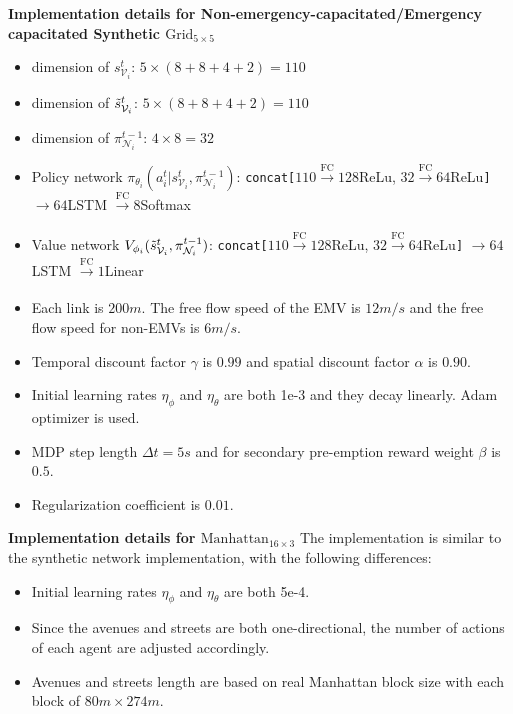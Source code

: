 \textbf{Implementation details for Non-emergency-capacitated/Emergency capacitated Synthetic \texorpdfstring{$\text{Grid}_{5 \times 5}$}{Grid}}
\begin{itemize}
    \item dimension of $s^t_{\mathcal{V}_i}$: $5 \times (8+8+4+2)=110$
    \item dimension of $\Tilde{s}^t_{\mathcal{V}_i}$: $5 \times (8+8+4+2)=110$
    \item dimension of $\pi^{t-1}_{\mathcal{N}_i}$: $4 \times 8 = 32$
    \item Policy network $\pi_{\theta_i}(a_i^t|s^t_{\mathcal{V}_i}, \pi^{t-1}_{\mathcal{N}_i})$: 
    \texttt{concat[}$110 \xrightarrow[]{\textrm{FC}} 128$ReLu, $32 \xrightarrow[]{\textrm{FC}} 64$ReLu\texttt{]} $ \xrightarrow[]{} 64$LSTM $ \xrightarrow[]{\textrm{FC}}8$Softmax
    \item Value network $V_{\phi_i}(\Tilde{s}^t_{\mathcal{V}_i}, \pi^{t-1}_{\mathcal{N}_i})$: \texttt{concat[}$110 \xrightarrow[]{\textrm{FC}} 128$ReLu, $32 \xrightarrow[]{\textrm{FC}} 64$ReLu\texttt{]} $ \xrightarrow[]{} 64$LSTM $ \xrightarrow[]{\textrm{FC}}1$Linear
    \item Each link is $200m$. The free flow speed of the EMV is $12m/s$ and the free flow speed for non-EMVs is $6m/s$.
    \item Temporal discount factor $\gamma$ is $0.99$ and spatial discount factor $\alpha$ is $0.90$.
    \item Initial learning rates $\eta_\phi$ and $\eta_\theta$ are both 1e-3 and they decay linearly. Adam optimizer is used.
    \item MDP step length $\Delta t = 5s$ and for secondary pre-emption reward weight $\beta$ is $0.5$.
    \item Regularization coefficient is $0.01$.
\end{itemize}
\textbf{Implementation details for \texorpdfstring{$\text{Manhattan}_{16 \times 3}$}{Manhattan}}
The implementation is similar to the synthetic network implementation, with the following differences:
\begin{itemize}
    \item Initial learning rates $\eta_\phi$ and $\eta_\theta$ are both 5e-4.
    \item Since the avenues and streets are both one-directional, the number of actions of each agent are adjusted accordingly. 
    \item Avenues and streets length are based on real Manhattan block size with each block of $80m \times 274m$.
\end{itemize}

